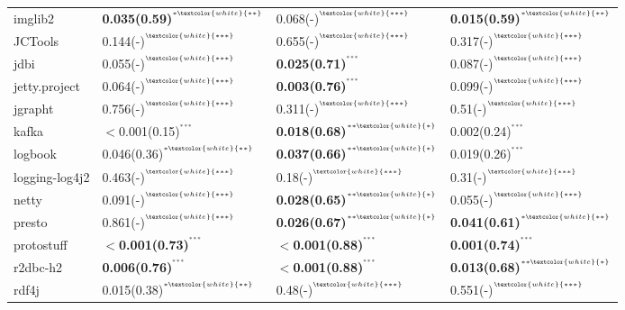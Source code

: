 \begin{tabular}{llll}
imglib2             &  \textbf{0.035(0.59)}\tiny{$^{^{*\textcolor{white}{**}}}$} &  0.068(-)\tiny{$^{^{\textcolor{white}{***}}}$} &  \textbf{0.015(0.59)}\tiny{$^{^{*\textcolor{white}{**}}}$} \\
JCTools             &  0.144(-)\tiny{$^{^{\textcolor{white}{***}}}$} &  0.655(-)\tiny{$^{^{\textcolor{white}{***}}}$} &  0.317(-)\tiny{$^{^{\textcolor{white}{***}}}$} \\
jdbi                &  0.055(-)\tiny{$^{^{\textcolor{white}{***}}}$} &  \textbf{0.025(0.71)}\tiny{$^{^{***}}$} &  0.087(-)\tiny{$^{^{\textcolor{white}{***}}}$} \\
jetty.project       &  0.064(-)\tiny{$^{^{\textcolor{white}{***}}}$} &  \textbf{0.003(0.76)}\tiny{$^{^{***}}$} &  0.099(-)\tiny{$^{^{\textcolor{white}{***}}}$} \\
jgrapht             &  0.756(-)\tiny{$^{^{\textcolor{white}{***}}}$} &  0.311(-)\tiny{$^{^{\textcolor{white}{***}}}$} &  0.51(-)\tiny{$^{^{\textcolor{white}{***}}}$} \\
kafka               &  $<$0.001(0.15)\tiny{$^{^{***}}$} &  \textbf{0.018(0.68)}\tiny{$^{^{**\textcolor{white}{*}}}$} &  0.002(0.24)\tiny{$^{^{***}}$} \\
logbook             &  0.046(0.36)\tiny{$^{^{*\textcolor{white}{**}}}$} &  \textbf{0.037(0.66)}\tiny{$^{^{**\textcolor{white}{*}}}$} &  0.019(0.26)\tiny{$^{^{***}}$} \\
logging-log4j2      &  0.463(-)\tiny{$^{^{\textcolor{white}{***}}}$} &  0.18(-)\tiny{$^{^{\textcolor{white}{***}}}$} &  0.31(-)\tiny{$^{^{\textcolor{white}{***}}}$} \\
netty               &  0.091(-)\tiny{$^{^{\textcolor{white}{***}}}$} &  \textbf{0.028(0.65)}\tiny{$^{^{**\textcolor{white}{*}}}$} &  0.055(-)\tiny{$^{^{\textcolor{white}{***}}}$} \\
presto              &  0.861(-)\tiny{$^{^{\textcolor{white}{***}}}$} &  \textbf{0.026(0.67)}\tiny{$^{^{**\textcolor{white}{*}}}$} &  \textbf{0.041(0.61)}\tiny{$^{^{*\textcolor{white}{**}}}$} \\
protostuff          &  \textbf{$<$0.001(0.73)}\tiny{$^{^{***}}$} &  \textbf{$<$0.001(0.88)}\tiny{$^{^{***}}$} &  \textbf{0.001(0.74)}\tiny{$^{^{***}}$} \\
r2dbc-h2            &  \textbf{0.006(0.76)}\tiny{$^{^{***}}$} &  \textbf{$<$0.001(0.88)}\tiny{$^{^{***}}$} &  \textbf{0.013(0.68)}\tiny{$^{^{**\textcolor{white}{*}}}$} \\
rdf4j               &  0.015(0.38)\tiny{$^{^{*\textcolor{white}{**}}}$} &  0.48(-)\tiny{$^{^{\textcolor{white}{***}}}$} &  0.551(-)\tiny{$^{^{\textcolor{white}{***}}}$} \\

\end{tabular}
